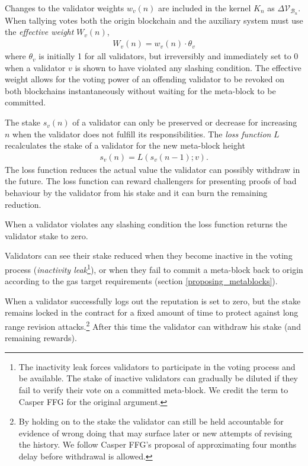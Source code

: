 \documentclass[12pt,a4paper]{article}
\begin{document}
Changes to the validator weights $w_v(n)$ are included in the kernel $K_n$ as $\Delta\mathcal{V}_{\mathcal{B}_n}$.  When tallying votes both the origin blockchain and the auxiliary system must use the \emph{effective weight} $W_v(n)$,
\begin{align*}
  W_v(n) = w_v(n) \cdot \theta_v
\end{align*}
where $\theta_v$ is initially 1 for all validators, but irreversibly and immediately set to 0 when a validator $v$ is shown to have violated any slashing condition.
The effective weight allows for the voting power of an offending validator to be revoked on both blockchains instantaneously without waiting for the meta-block to be committed.

The stake $s_v(n)$ of a validator can only be preserved or decrease for increasing $n$ when the validator does not fulfill its responsibilities.
The \emph{loss function} $L$ recalculates the stake of a validator for the new meta-block height
\begin{align}
  s_v(n) = L(s_v(n-1); v).
\end{align}
The loss function reduces the actual value the validator can possibly withdraw in the future.  The loss function can reward challengers for presenting proofs of bad behaviour by the validator from his stake and it can burn the remaining reduction.

When a validator violates any slashing condition the loss function returns the validator stake to zero.

Validators can see their stake reduced when they become inactive in the voting process (\emph{inactivity leak}\footnote{
  The inactivity leak forces validators to participate in the voting process and be available.
  The stake of inactive validators can gradually be diluted if they fail to verify their vote on a committed meta-block.
  We credit the term to Casper FFG\cite{casperffg} for the original argument.
}), or when they fail to commit a meta-block back to origin according to the gas target requirements (section  \ref{proposing_metablocks}).

When a validator successfully logs out the reputation is set to zero, but the stake remains locked in the contract for a fixed amount of time to protect against long range revision attacks.\footnote{
  By holding on to the stake the validator can still be held accountable for evidence of wrong doing that may surface later or new attempts of revising the history.
  We follow Casper FFG's proposal of approximating four months delay before withdrawal is allowed.}
After this time the validator can withdraw his stake (and remaining rewards).
\end{document}
